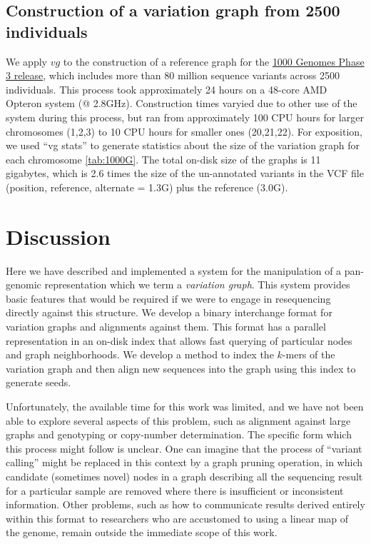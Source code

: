 \documentclass{article}
\begin{document}
\subsection{Construction of a variation graph from 2500 individuals}

We apply $vg$ to the construction of a reference graph for the \href{http://www.1000genomes.org/announcements/phase3-variant-calls-chry-are-available-variant-calls-chrx-have-been-updated-2014-11-0}{1000 Genomes Phase 3 release}, which includes more than 80 million sequence variants across 2500 individuals. This process took approximately 24 hours on a 48-core AMD Opteron system (@ 2.8GHz). Construction times varyied due to other use of the system during this process, but ran from approximately 100 CPU hours for larger chromosomes (1,2,3) to 10 CPU hours for smaller ones (20,21,22). For exposition, we used ``vg stats'' to generate statistics about the size of the variation graph for each chromosome \ref{tab:1000G}. The total on-disk size of the graphs is 11 gigabytes, which is 2.6 times the size of the un-annotated variants in the VCF file (position, reference, alternate = 1.3G) plus the reference (3.0G).


\section{Discussion}

Here we have described and implemented a system for the manipulation of a pan-genomic representation which we term a \emph{variation graph}. This system provides basic features that would be required if we were to engage in resequencing directly against this structure. We develop a binary interchange format for variation graphs and alignments against them. This format has a parallel representation in an on-disk index that allows fast querying of particular nodes and graph neighborhoods. We develop a method to index the $k$-mers of the variation graph and then align new sequences into the graph using this index to generate seeds.

Unfortunately, the available time for this work was limited, and we have not been able to explore several aspects of this problem, such as alignment against large graphs and genotyping or copy-number determination. The specific form which this process might follow is unclear. One can imagine that the process of ``variant calling'' might be replaced in this context by a graph pruning operation, in which candidate (sometimes novel) nodes in a graph describing all the sequencing result for a particular sample are removed where there is insufficient or inconsistent information. Other problems, such as how to communicate results derived entirely within this format to researchers who are accustomed to using a linear map of the genome, remain outside the immediate scope of this work.



{}


\end{document}
